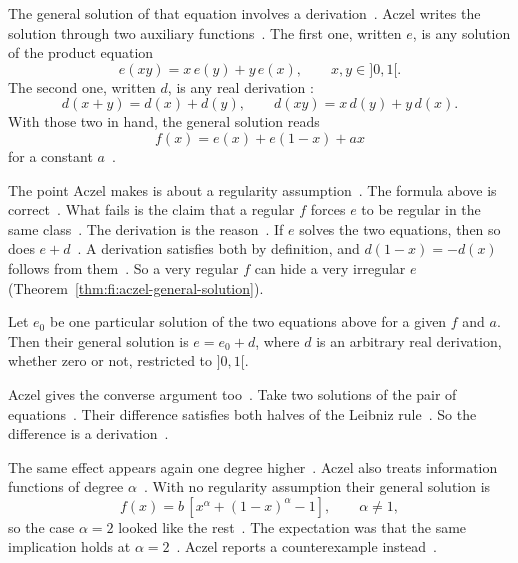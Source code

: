 The general solution of that equation involves a
derivation~\cite[p.~195]{Aczel1981}. Aczel writes the solution through two
auxiliary functions~\cite[p.~195]{Aczel1981}. The first one, written $e$, is
any solution of the product equation
\[
  e(xy) = x\,e(y) + y\,e(x), \qquad x, y \in {]0,1[} .
\]
The second one, written $d$, is any real derivation
\cite[pp.~191 and 194]{Aczel1981}:
\[
  d(x+y) = d(x) + d(y), \qquad d(xy) = x\,d(y) + y\,d(x).
\]
With those two in hand, the general solution reads
\[
  f(x) = e(x) + e(1-x) + ax
\]
for a constant $a$~\cite[p.~195]{Aczel1981}.

The point Aczel makes is about a regularity
assumption~\cite[p.~195]{Aczel1981}. The formula above is
correct~\cite[p.~195]{Aczel1981}. What fails is the claim that a regular $f$
forces $e$ to be regular in the same class~\cite[p.~195]{Aczel1981}. The
derivation is the reason~\cite[p.~195]{Aczel1981}. If $e$ solves the two
equations, then so does $e + d$~\cite[p.~195]{Aczel1981}. A derivation
satisfies both by definition, and $d(1-x) = -d(x)$ follows from
them~\cite[p.~195]{Aczel1981}. So a very regular $f$ can hide a very irregular
$e$~ (Theorem~\ref{thm:fi:aczel-general-solution})\cite[p.~195]{Aczel1981}.

\begin{theorem}\label{thm:fi:aczel-general-solution}
Let $e_0$ be one particular solution of the two equations above for a given
$f$ and $a$. Then their general solution is $e = e_0 + d$, where $d$ is an
arbitrary real derivation, whether zero or not, restricted to ${]0,1[}$.
\end{theorem}

Aczel gives the converse argument too~\cite[p.~195]{Aczel1981}. Take two
solutions of the pair of equations~\cite[p.~195]{Aczel1981}. Their difference
satisfies both halves of the Leibniz
rule~\cite[p.~195]{Aczel1981}. So the difference is a
derivation~\cite[p.~195]{Aczel1981}.

The same effect appears again one degree
higher~\cite[p.~199]{Aczel1981}. Aczel also treats information functions of
degree $\alpha$~\cite[p.~199]{Aczel1981}. With no regularity assumption their
general solution is
\[
  f(x) = b\,[x^\alpha + (1-x)^\alpha - 1], \qquad \alpha \neq 1,
\]
so the case $\alpha = 2$ looked like the
rest~\cite[pp.~198--199]{Aczel1981}. The expectation was that the same
implication holds at $\alpha = 2$~\cite[p.~199]{Aczel1981}. Aczel reports a
counterexample instead~\cite[p.~199]{Aczel1981}.

